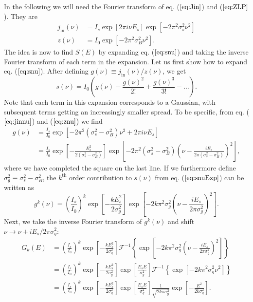 \documentclass[a4paper,11pt]{article}
\begin{document}
In the following we will need the Fourier transform of eq. ($\ref{eq:Jin}$) and ($\ref{eq:ZLP}$). They are
\begin{align}
\label{eq:jinnu}
j_{\mathrm{in}}(\nu) &= I_s\exp[2\pi i \nu E_s]\exp[-2\pi^2\sigma_s^2\nu^2]\\
z(\nu)&=I_0\exp[-2\pi^2\sigma_B^2\nu^2].
\label{eq:znu}
\end{align}
The idea is now to find $S(E)$ by expanding eq. ($\ref{eq:snu}$) and taking the inverse Fourier transform of each term in the expansion. Let us first show how to expand eq. ($\ref{eq:snu}$). After defining $g(\nu)\equiv j_{\mathrm{in}}(\nu)/z(\nu)$, we get
\begin{equation}
s(\nu) = I_0\left(g(\nu)-\frac{g(\nu)^2}{2!}+\frac{g(\nu)^3}{3!}-\dots\right).
\label{eq:snuExp}
\end{equation}
Note that each term in this expansion corresponds to a Gaussian, with subsequent terms getting an increasingly smaller spread. To be specific, from eq. ($\ref{eq:jinnu}$) and ($\ref{eq:znu}$) we find
\begin{align}
\nonumber g(\nu ) &= \frac{I_s}{I_0}\exp[-2\pi^2(\sigma_s^2-\sigma_B^2)\nu^2 + 2\pi i \nu E_s]\\
&= \frac{I_s}{I_0}\exp\left[-\frac{E_s^2}{2(\sigma_s^2-\sigma_B^2)}\right]\exp\left[-2\pi^2(\sigma_s^2-\sigma_B^2)\left(\nu - \frac{iE_s}{2\pi(\sigma_s^2-\sigma_B^2)}\right)^2\right],
\end{align}
where we have completed the square on the last line. If we furthermore define $\sigma_g^2 \equiv \sigma_s^2-\sigma_B^2$, the $k^{\mathrm{th}}$ order contribution to $s(\nu)$ from eq. ($\ref{eq:snuExp}$) can be written as
\begin{equation}
g^k(\nu) = \left(\frac{I_s}{I_0}\right)^k\exp\left[-\frac{kE_s^2}{2\sigma_g^2}\right]\exp\left[-2k\pi^2\sigma_g^2\left(\nu - \frac{iE_s}{2\pi\sigma_g^2}\right)^2\right].
\end{equation}
Next, we take the inverse Fourier transform of $g^k(\nu)$ and shift $\nu \rightarrow \nu + iE_s/2\pi\sigma_g^2$:
\begin{align}
\nonumber G_{k}(E) &= \left(\frac{I_s}{I_0}\right)^k\exp\left[-\frac{kE_s^2}{2\sigma_g^2}\right]\mathcal{F}^{-1}\left\{\exp\left[-2k\pi^2\sigma_g^2\left(\nu - \frac{iE_s}{2\pi\sigma_g^2}\right)^2\right]\right\}\\
\nonumber&= \left(\frac{I_s}{I_0}\right)^k\exp\left[-\frac{kE_s^2}{2\sigma_g^2}\right]\exp\left[\frac{E_sE}{\sigma_g^2}\right]\mathcal{F}^{-1}\left\{\exp[-2k\pi^2\sigma_g^2\nu^2]\right\}\\
&=\left(\frac{I_s}{I_0}\right)^k\exp\left[-\frac{kE_s^2}{2\sigma_g^2}\right]\exp\left[\frac{E_sE}{\sigma_g^2}\right]\frac{1}{\sqrt{2k\pi\sigma_g^2}}\exp\left[-\frac{E^2}{2k\sigma_g^2}\right].
\label{eq:GkE}
\end{align}
\end{document}
